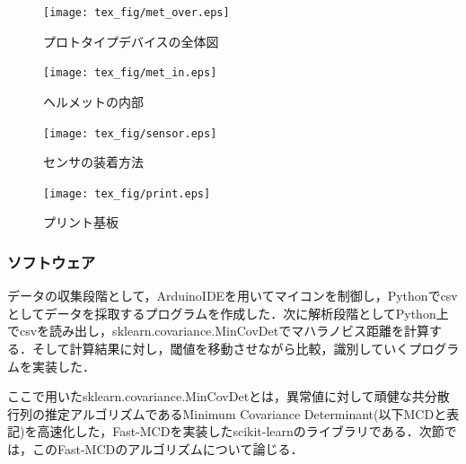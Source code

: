 \documentclass[a4j]{jarticle}%
\begin{document}
\begin{figure}[!t]
  \begin{center}
    \texttt{[image: tex\_fig/met\_over.eps]}
  \end{center}
    \vspace{-8mm}
  \caption{プロトタイプデバイスの全体図}
  \label{met_over}
\end{figure}

\begin{figure}[!t]
  \begin{center}
    \texttt{[image: tex\_fig/met\_in.eps]}
  \end{center}
    \vspace{-8mm}
  \caption{ヘルメットの内部}
  \label{met_in}
\end{figure}

\begin{figure}[!t]
  \begin{center}
    \texttt{[image: tex\_fig/sensor.eps]}
  \end{center}
    \vspace{-8mm}
  \caption{センサの装着方法}
  \label{sensor}
\end{figure}

\begin{figure}[!t]
  \begin{center}
    \texttt{[image: tex\_fig/print.eps]}
  \end{center}
    \vspace{-8mm}
  \caption{プリント基板}
  \label{print}
\end{figure}

\subsubsection{ソフトウェア}
データの収集段階として，ArduinoIDEを用いてマイコンを制御し，Pythonでcsvとしてデータを採取するプログラムを作成した．次に解析段階としてPython上でcsvを読み出し，sklearn.covariance.MinCovDetでマハラノビス距離を計算する．そして計算結果に対し，閾値を移動させながら比較，識別していくプログラムを実装した．\par
ここで用いたsklearn.covariance.MinCovDetとは，異常値に対して頑健な共分散行列の推定アルゴリズムであるMinimum Covariance Determinant(以下MCDと表記)を高速化した，Fast-MCDを実装したscikit-learnのライブラリである．次節では，このFast-MCDのアルゴリズムについて論じる．
\end{document}
